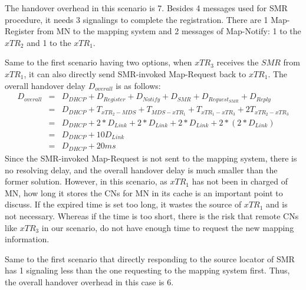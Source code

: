 The handover overhead in this scenario is 7. Besides 4 messages used for SMR procedure, it needs 3 signalings to complete the registration. There are 1 Map-Register from MN to the mapping system and 2 messages of Map-Notify: 1 to the $xTR_2$ and 1 to the $xTR_1$.

Same to the first scenario having two options, when $xTR_3$ receives the $SMR$ from $xTR_1$, it can also directly send SMR-invoked Map-Request back to $xTR_1$. The overall handover delay $D_{overall}$ is as follows:
\begin{eqnarray}
D_{overall} &=& D_{DHCP} + D_{Register} + D_{Notify} + D_{SMR} + D_{Request_{SMR}} + D_{Reply} \nonumber \\
&=& D_{DHCP} + T_{xTR_2-MDS} + T_{MDS-xTR_1} + T_{xTR_1-xTR_3} + 2T_{xTR_2-xTR_3} \nonumber \\
&=& D_{DHCP} +2*D_{Link} + 2*D_{Link} + 2*D_{Link} + 2*(2*D_{Link}) \nonumber \\
&=& D_{DHCP} + 10D_{Link}  \\
&=& D_{DHCP} + 20 ms \nonumber
\end{eqnarray}
Since the SMR-invoked Map-Request is not sent to the mapping system, there is no resolving delay, and the overall handover delay is much smaller than the former solution. However, in this scenario, as $xTR_1$ has not been in charged of MN, how long it stores the CNs for MN in its cache is an important point to discuss. If the expired time is set too long, it wastes the source of $xTR_1$ and is not necessary. Whereas if the time is too short, there is the risk that remote CNs like $xTR_3$ in our scenario, do not have enough time to request the new mapping information.

Same to the first scenario that directly responding to the source locator of SMR has 1 signaling less than the one requesting to the mapping system first. Thus, the overall handover overhead in this case is 6.

